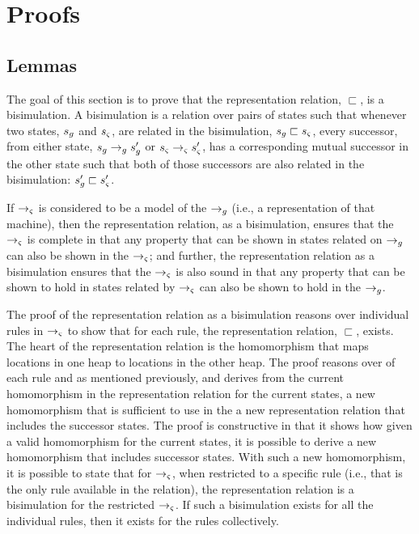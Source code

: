 \section{Proofs}
\subsection{Lemmas}

The goal of this section is to prove that the representation relation,
$\sqsubset$, is a bisimulation.  A bisimulation is a relation over pairs of states such that whenever two states, $s_{g}$ and
$s_{\varsigma}$, are related in the bisimulation, $s_{g} \sqsubset
s_{\varsigma}$, every successor, from either state, $s_{g}
\rightarrow_{g} s_{g}^\prime$ or $s_{\varsigma} \rightarrow_{\varsigma}
s_{\varsigma}^\prime$, has a corresponding mutual successor in the other
state such that both of those successors are also related in the
bisimulation: $s_{g}^\prime \sqsubset s_{\varsigma}^\prime$.

If $\rightarrow_{\varsigma}$ is considered to be a model of the
$\rightarrow_{g}$ (i.e., a representation of that machine), then the
representation relation, as a bisimulation, ensures that the
$\rightarrow_{\varsigma}$ is complete in that any property that can be
shown in states related on $\rightarrow_{g}$ can also be shown in the
$\rightarrow_{\varsigma}$; and further, the representation relation as a
bisimulation ensures that the $\rightarrow_{\varsigma}$ is also sound in
that any property that can be shown to hold in states related by $\rightarrow_{\varsigma}$
can also be shown to hold in the $\rightarrow_{g}$.

The proof of the representation relation as a bisimulation reasons
over individual rules in $\rightarrow_{\varsigma}$ to show that for
each rule, the representation relation, $\sqsubset$, exists. The heart
of the representation relation is the homomorphism that maps locations
in one heap to locations in the other heap. The proof reasons over of
each rule and as mentioned previously, and derives from the current
homomorphism in the representation relation for the current states, a
new homomorphism that is sufficient to use in the a new representation
relation that includes the successor states. The proof is constructive
in that it shows how given a valid homomorphism for the current
states, it is possible to derive a new homomorphism that includes
successor states. With such a new homomorphism, it is possible to
state that for $\rightarrow_{\varsigma}$, when restricted to a specific
rule (i.e., that is the only rule available in the relation), the
representation relation is a bisimulation for the restricted
$\rightarrow_{\varsigma}$. If such a bisimulation exists for all the
individual rules, then it exists for the rules collectively.

